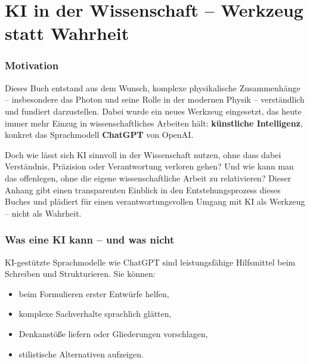 \cleardoublepage

\renewcommand{\thesection}{\thechapter.\arabic{section}}
\renewcommand{\thechapter}{C}

\chapter{KI in der Wissenschaft – Werkzeug statt Wahrheit}


\label{anhangC:ki}


\subsection*{Motivation}
Dieses Buch entstand aus dem Wunsch, komplexe physikalische Zusammenhänge – insbesondere das Photon und seine Rolle in der modernen Physik – verständlich und fundiert darzustellen. Dabei wurde ein neues Werkzeug eingesetzt, das heute immer mehr Einzug in wissenschaftliches Arbeiten hält: \textbf{künstliche Intelligenz}, konkret das Sprachmodell \textbf{ChatGPT} von OpenAI.

Doch wie lässt sich KI sinnvoll in der Wissenschaft nutzen, ohne dass dabei Verständnis, Präzision oder Verantwortung verloren gehen? Und wie kann man das offenlegen, ohne die eigene wissenschaftliche Arbeit zu relativieren? Dieser Anhang gibt einen transparenten Einblick in den Entstehungsprozess dieses Buches und plädiert für einen verantwortungsvollen Umgang mit KI als Werkzeug – nicht als Wahrheit.

\subsection*{Was eine KI kann – und was nicht}
KI-gestützte Sprachmodelle wie ChatGPT sind leistungsfähige Hilfsmittel beim Schreiben und Strukturieren. Sie können:
\begin{itemize}
	\item beim Formulieren erster Entwürfe helfen,
	\item komplexe Sachverhalte sprachlich glätten,
	\item Denkanstöße liefern oder Gliederungen vorschlagen,
	\item stilistische Alternativen aufzeigen.
\end{itemize}


